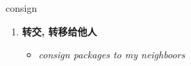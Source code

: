 
\begin{frame}
{\huge consign}
\begin{center}
\begin{enumerate}\Large
  \item \textbf{转交, 转移给他人}
  \begin{itemize}
    \item \em{\Large{consign packages to my neighboors}}
  \end{itemize}
\end{enumerate}
\end{center}
\end{frame}
